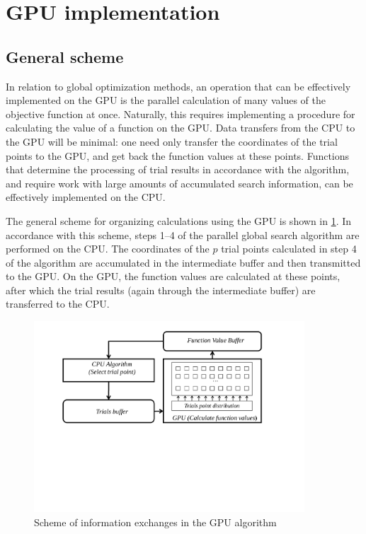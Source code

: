 \documentclass{svproc}
\begin{document}
\section{GPU implementation}

\subsection{General scheme}

In relation to global optimization methods, an operation that can be effectively implemented on the GPU is the parallel calculation of many values of the objective function at once. Naturally, this requires implementing a procedure for calculating the value of a function on the GPU. Data transfers from the CPU to the GPU will be minimal: one need only transfer the coordinates of the trial points to the GPU, and get back the function values at these points. Functions that determine the processing of trial results in accordance with the algorithm, and require work with large amounts of accumulated search information, can be effectively implemented on the CPU.

   The general scheme for organizing calculations using the GPU is shown in \ref{fig:GPU_Algorithm}. In accordance with this scheme, steps 1--4 of the parallel global search algorithm are performed on the CPU. The coordinates of the $p$ trial points calculated in step 4 of the algorithm are accumulated in the intermediate buffer and then transmitted to the GPU. On the GPU, the function values are calculated at these points, after which the trial results (again through the intermediate buffer) are transferred to the CPU.
   
   \begin{figure}[h!]
    \centering
		\includegraphics[width=0.9\textwidth]{GPU_Algorithm.pdf}
		\caption{Scheme of information exchanges in the GPU algorithm}\label{fig:GPU_Algorithm}
\end{figure}
\end{document}
